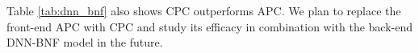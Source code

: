 \documentclass[a4paper]{article}
\begin{document}
Table \ref{tab:dnn_bnf} also shows CPC outperforms  APC. We plan to replace the front-end APC  with CPC and study its efficacy in combination with the back-end DNN-BNF model in the future. 








\end{document}
